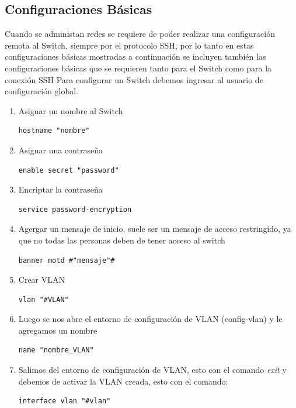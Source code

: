\documentclass[journal]{IEEEtran}
\begin{document}
\subsection{\textbf{Configuraciones Básicas}}
Cuando se administan redes se requiere de poder realizar una configuración remota al Switch, siempre por el protocolo SSH, por lo tanto en estas configuraciones básicas mostradas a continuación se incluyen también las configuraciones básicas que se requieren tanto para el Switch como para la conexión SSH
Para configurar un Switch debemos ingresar al usuario de configuración global.
\begin{enumerate}
	
	\item Asignar un nombre al Switch
	\begin{lstlisting}[frame=single]
hostname "nombre"
	\end{lstlisting}
	
	\item Asignar una contraseña
	\begin{lstlisting}[frame=single]
enable secret "password"
	\end{lstlisting}
	
	\item Encriptar la contraseña
	
	\begin{lstlisting}[frame=single]
service password-encryption
	\end{lstlisting}
	
	\item Agergar un mensaje de inicio, suele ser un mensaje de acceso restringido, ya que no todas las personas deben de tener acceso al switch
	\begin{lstlisting}[frame=single]
banner motd #"mensaje"#
	\end{lstlisting}
	
	\item Crear VLAN
	\begin{lstlisting}[frame=single]
vlan "#VLAN"
	\end{lstlisting}
	
	\item Luego se nos abre el entorno de configuración de VLAN (config-vlan) y le agregamos un nombre
	\begin{lstlisting}[frame=single]
name "nombre_VLAN"
	\end{lstlisting}
	
	\item Salimos del entorno de configuración de VLAN, esto con el comando \textit{exit} y debemos de activar la VLAN creada, esto con el comando:
	\begin{lstlisting}[frame=single]
interface vlan "#vlan"
	\end{lstlisting} 
	

\end{enumerate}
\end{document}
